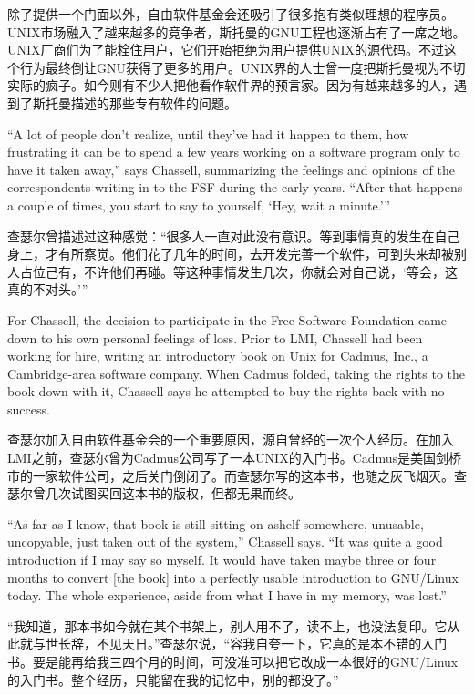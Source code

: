 \ifdefined\chs
除了提供一个门面以外，自由软件基金会还吸引了很多抱有类似理想的程序员。UNIX市场融入了越来越多的竞争者，斯托曼的GNU工程也逐渐占有了一席之地。UNIX厂商们为了能栓住用户，它们开始拒绝为用户提供UNIX的源代码。不过这个行为最终倒让GNU获得了更多的用户。UNIX界的人士曾一度把斯托曼视为不切实际的疯子。如今则有不少人把他看作软件界的预言家。\ifdefined\vtwo 因为有越来越多的人，遇到了斯托曼描述的那些专有软件的问题。\fi
\fi

\ifdefined\eng
``A lot of people don't realize, until they've had it happen to them, how frustrating it can be to spend a few years working on a software program only to have it taken away,'' says Chassell, summarizing the feelings and opinions of the correspondents writing in to the FSF during the early years. ``After that happens a couple of times, you start to say to yourself, `Hey, wait a minute.'\hspace{0.01in}''
\fi

\ifdefined\chs
查瑟尔曾描述过这种感觉：``很多人一直对此没有意识。等到事情真的发生在自己身上，才有所察觉。他们花了几年的时间，去开发完善一个软件，可到头来却被别人占位己有，不许他们再碰。等这种事情发生几次，你就会对自己说，`等会，这真的不对头。'\hspace{0.01in}''
\fi

\ifdefined\eng
For Chassell, the decision to participate in the Free Software Foundation came down to his own personal feelings of loss. Prior to LMI, Chassell had been working for hire, writing an introductory book on Unix for Cadmus, Inc., a Cambridge-area software company. When Cadmus folded, taking the rights to the book down with it, Chassell says he attempted to buy the rights back with no success.
\fi

\ifdefined\chs
查瑟尔加入自由软件基金会的一个重要原因，源自曾经的一次个人经历。在加入LMI之前，查瑟尔曾为Cadmus公司写了一本UNIX的入门书。Cadmus是美国剑桥市的一家软件公司，之后关门倒闭了。而查瑟尔写的这本书，也随之灰飞烟灭。查瑟尔曾几次试图买回这本书的版权，但都无果而终。
\fi

\ifdefined\eng
``As far as I know, that book is still sitting on \ifdefined\vtwo a\fi shelf somewhere, unusable, uncopyable, just taken out of the system,'' Chassell says. ``It was quite a good introduction if I may say so myself. It would have taken maybe three or four months to convert [the book] into a perfectly usable introduction to GNU/Linux today. The whole experience, aside from what I have in my memory, was lost.''
\fi

\ifdefined\chs
``我知道，那本书如今就在某个书架上，别人用不了，读不上，也没法复印。它从此就与世长辞，不见天日。''查瑟尔说，``容我自夸一下，它真的是本不错的入门书。要是能再给我三四个月的时间，可没准可以把它改成一本很好的GNU/Linux的入门书。整个经历，只能留在我的记忆中，别的都没了。''
\fi


